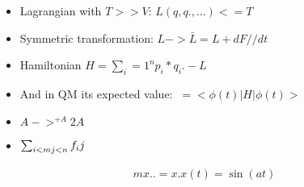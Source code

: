 \begin{itemize} %
	\item Lagrangian with $T >>  V$: $L(q,      q., ...   ) <=   T$
	\item Symmetric transformation: $L ->  \bar L = L +       dF//dt $
	\item Hamiltonian $H=\sum_i=1  ^ n p_i *          q_i. - L$
	\item And in QM its expected value: $~=             <\phi(t) | H | \phi(t)>$
	\item $A          ->^{+A} 2A$
	\item $\sum_          {i<m \\ j<n}  f_ ij$
\end{itemize}

\begin{align}
  m       x.. =      x.
  x(t)   = \sin(at)
\end{align}

